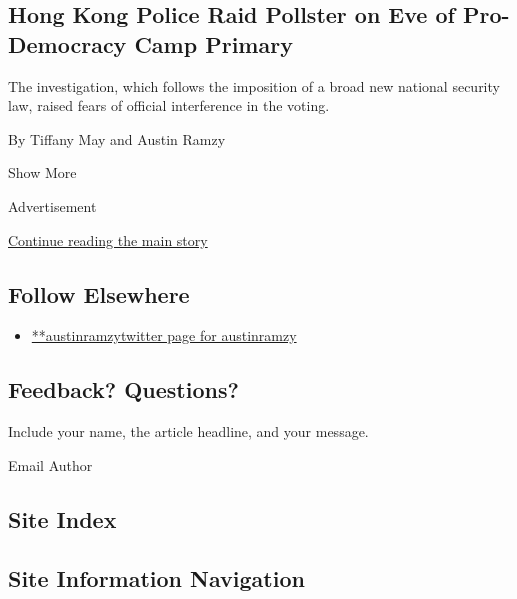 \begin{enumerate}
  \hypertarget{hong-kong-police-raid-pollster-on-eve-of-pro-democracy-camp-primary}{%
  \subsection{Hong Kong Police Raid Pollster on Eve of Pro-Democracy
  Camp
  Primary}\label{hong-kong-police-raid-pollster-on-eve-of-pro-democracy-camp-primary}}

  The investigation, which follows the imposition of a broad new
  national security law, raised fears of official interference in the
  voting.

  By Tiffany May and Austin Ramzy
\end{enumerate}

Show More

Advertisement

\protect\hyperlink{after-mid2}{Continue reading the main story}

\hypertarget{follow-elsewhere}{%
\subsection{Follow Elsewhere}\label{follow-elsewhere}}

\begin{itemize}
\tightlist
\item
  \href{https://twitter.com/austinramzy}{**austinramzytwitter page for
  austinramzy}
\end{itemize}

\hypertarget{feedback-questions}{%
\subsection{Feedback? Questions?}\label{feedback-questions}}

Include your name, the article headline, and your message.

Email Author

\hypertarget{site-index}{%
\subsection{Site Index}\label{site-index}}

\hypertarget{site-information-navigation}{%
\subsection{Site Information
Navigation}\label{site-information-navigation}}

